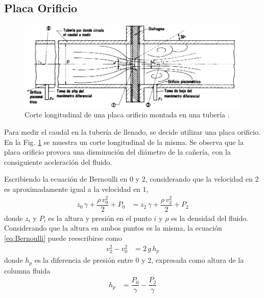 \subsection{Placa Orificio}
\label{subsec:PlacaOrificio}


\begin{figure}[t]
 \centering
\includegraphics[width=\textwidth]{Cap2-DisenoEnsamblado/images/placaOrif.png}
\caption{Corte longitudinal de una placa orificio montada en una tubería
\cite{bib:Mataix}.}
 \label{fig:placaOrificio}
\end{figure}

Para medir el caudal en la tubería de llenado, se decide
utilizar una placa orificio.
En la Fig. \ref{fig:placaOrificio} se muestra un
corte longitudinal de la misma.
Se observa que la placa orificio provoca una disminución del diámetro
de la cañería, con la consiguiente aceleración del fluido.

Escribiendo la ecuación de Bernoulli en 0 y 2, considerando que la velocidad en
2 es aproximadamente igual a la velocidad en 1,
\begin{align}
 z_0 \, \gamma + \dfrac{\rho \,v_0^2}{2} + P_0 &= z_2 \, \gamma + \dfrac{\rho
\,v_2^2}{2} + P_2
\label{eq:Bernoulli}
\end{align}
donde $z_i$ y $P_i$ es la altura y presión en el punto $i$ y $\rho$ es 
la densidad del fluido.
Considerando que la altura en ambos puntos es la misma, la ecuación
\eqref{eq:Bernoulli} puede reescribirse como
\begin{align}
 v_2^2 - v_0^2 &= 2\,g\,h_p
 \label{eq:Bernoulli2}
\end{align}
donde $h_p$ es la diferencia de presión entre 0 y 2, expresada como
altura de la columna fluida
\begin{align}
 h_p &= \dfrac{P_0}{\gamma}-\dfrac{P_2}{\gamma}
\end{align}

